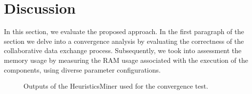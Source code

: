 \label{sec:discussion:subsec:convergence}

\section{Discussion}
\label{sec:evaluation}

In this section, we evaluate the proposed approach. In the first paragraph of the section  we delve into a convergence analysis by evaluating the correctness of the collaborative data exchange process. Subsequently, we took into assessment the memory usage by measuring the RAM usage associated with the execution of the  components, using diverse parameter configurations.
\begin{figure}[t]
	\hfill
	\hfill
	\vspace{1em}
	\hfill
	\vspace{1em}
	\caption{Outputs of the HeuristicsMiner used for the convergence test.}
	\label{fig:wfnet}
\end{figure}

